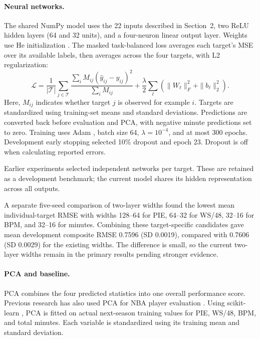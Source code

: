 \documentclass{article}
\begin{document}
\paragraph{Neural networks.}
The shared NumPy model \cite{harris2020} uses the 22 inputs described in
Section~2, two ReLU hidden layers (64 and 32 units), and a four-neuron linear
output layer. Weights use He initialization \cite{he2015}. The masked
task-balanced loss averages each target's MSE over its available labels, then
averages across the four targets, with L2 regularization:
\begin{equation}
  \mathcal{L}=\frac{1}{|\mathcal{T}|}
  \sum_{j\in\mathcal{T}}
  \frac{\sum_i M_{ij}\left(\widehat{y}_{ij}-y_{ij}\right)^2}
  {\sum_i M_{ij}}
  +\frac{\lambda}{2}\sum_{\ell}
  \left(\|W_{\ell}\|_F^2+\|b_{\ell}\|_2^2\right).
\end{equation}
Here, $M_{ij}$ indicates whether target $j$ is observed for example $i$.
Targets are standardized using training-set means and standard deviations.
Predictions are converted back before evaluation and PCA, with negative minute
predictions set to zero. Training uses Adam \cite{kingma2015}, batch size 64,
$\lambda=10^{-4}$, and at most 300 epochs. Development early stopping selected
10\% dropout \cite{srivastava2014} and epoch 23. Dropout is off when calculating
reported errors.

Earlier experiments selected independent networks per target. These are
retained as a development benchmark; the current model shares its hidden
representation across all outputs.

A separate five-seed comparison of two-layer widths found the lowest mean
individual-target RMSE with widths 128--64 for PIE, 64--32 for WS/48, 32--16
for BPM, and 32--16 for minutes. Combining these target-specific candidates gave
mean development composite RMSE 0.7596 (SD 0.0019), compared with 0.7606
(SD 0.0029) for the existing widths. The difference is small, so the current
two-layer widths remain in the primary results pending stronger evidence.

\paragraph{PCA and baseline.}
PCA combines the four predicted statistics into one overall performance score.
Previous research has also used PCA for NBA player evaluation \cite{oliveira2024}.
Using scikit-learn \cite{pedregosa2011}, PCA is fitted on actual next-season
training values for PIE, WS/48, BPM, and total minutes. Each variable is
standardized using its training mean and standard deviation.
\end{document}
